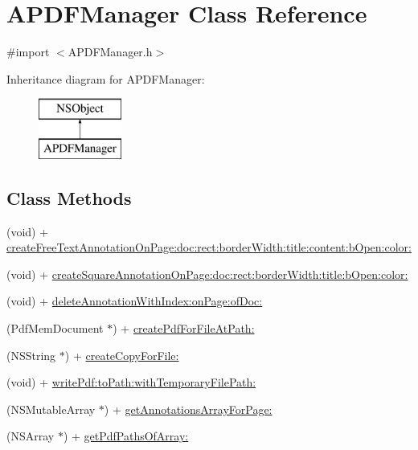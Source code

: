 \hypertarget{interface_a_p_d_f_manager}{\section{A\-P\-D\-F\-Manager Class Reference}
\label{interface_a_p_d_f_manager}
}


{\ttfamily \#import $<$A\-P\-D\-F\-Manager.\-h$>$}

Inheritance diagram for A\-P\-D\-F\-Manager\-:\begin{figure}[H]
\begin{center}
\leavevmode
\includegraphics[height=2.000000cm]{interface_a_p_d_f_manager}
\end{center}
\end{figure}
\subsection*{Class Methods}
\begin{DoxyCompactItemize}
\item 
(void) + \hyperlink{interface_a_p_d_f_manager_ae7b63b7251ff02456aefd5bb88ff3133}{create\-Free\-Text\-Annotation\-On\-Page\-:doc\-:rect\-:border\-Width\-:title\-:content\-:b\-Open\-:color\-:}
\item 
(void) + \hyperlink{interface_a_p_d_f_manager_a423ccf0d14b8dfd3e5248eddd917cfd2}{create\-Square\-Annotation\-On\-Page\-:doc\-:rect\-:border\-Width\-:title\-:b\-Open\-:color\-:}
\item 
(void) + \hyperlink{interface_a_p_d_f_manager_a37b257ca0c98017a4685056aab000c5b}{delete\-Annotation\-With\-Index\-:on\-Page\-:of\-Doc\-:}
\item 
(Pdf\-Mem\-Document $\ast$) + \hyperlink{interface_a_p_d_f_manager_a62bcf992714cbe89528ffe5d64775174}{create\-Pdf\-For\-File\-At\-Path\-:}
\item 
(N\-S\-String $\ast$) + \hyperlink{interface_a_p_d_f_manager_aba5874a0ee2f103062025d6b520f5d83}{create\-Copy\-For\-File\-:}
\item 
(void) + \hyperlink{interface_a_p_d_f_manager_a663468ddda29b1b5a3c154562c6dafa6}{write\-Pdf\-:to\-Path\-:with\-Temporary\-File\-Path\-:}
\item 
(N\-S\-Mutable\-Array $\ast$) + \hyperlink{interface_a_p_d_f_manager_ad924b47d2d56c43a886a221abb007980}{get\-Annotations\-Array\-For\-Page\-:}
\item 
(N\-S\-Array $\ast$) + \hyperlink{interface_a_p_d_f_manager_a0d5aaff8461d095d3d929738a32cbf0d}{get\-Pdf\-Paths\-Of\-Array\-:}
\end{DoxyCompactItemize}


